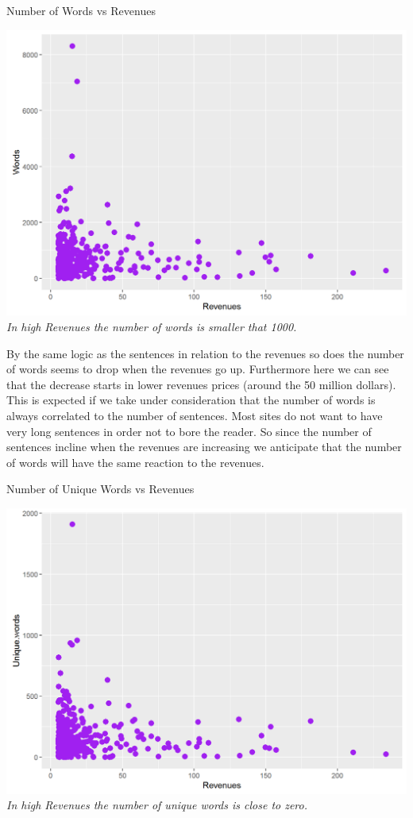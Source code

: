 \documentclass{article}
\begin{document}
\begin{table}[H]
\centering
\caption{Number of Words vs Revenues}
\begin{center}
\includegraphics[scale=0.4]{../R/photos/37_w_rev.png}   \\
\textit{In high Revenues the number of words is smaller that 1000.}
\end{center}
\end{table}
By the same logic as the sentences in relation to the revenues so does the number of words seems to drop when the revenues go up. Furthermore here we can see that the decrease starts in lower revenues prices (around the 50 million dollars). This is expected if we take under consideration that the number of words is always correlated to the number of sentences. Most sites do not want to have very long sentences in order not to bore the reader. So since the number of sentences incline when the revenues are increasing we anticipate that the number of words will have the same reaction to the revenues.
\begin{table}[H]
\centering
\caption{Number of Unique Words vs Revenues}
\begin{center}
\includegraphics[scale=0.4]{../R/photos/35_uw_rev.png}    \\
\textit{In high Revenues the number of unique words is close to zero.}
\end{center}
\end{table}
\end{document}
